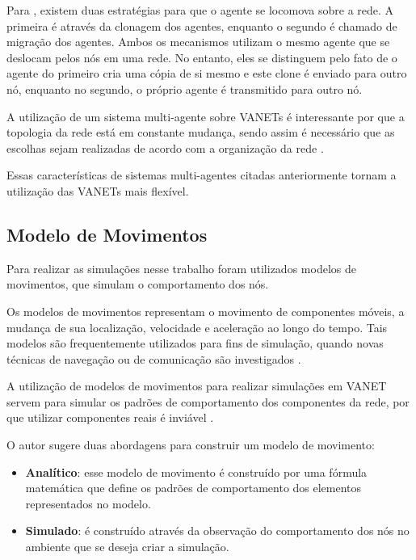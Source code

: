 Para \cite{Freitas:2011}, existem duas estratégias para que o agente se locomova sobre a rede. A primeira é através da clonagem dos agentes, enquanto o segundo é chamado de migração dos agentes. Ambos os mecanismos utilizam o mesmo agente que se deslocam pelos nós em uma rede. No entanto, eles se distinguem pelo fato de o agente do primeiro cria uma cópia de si mesmo e este clone é enviado para outro nó, enquanto no segundo, o próprio agente é transmitido para outro nó.


A utilização de um sistema multi-agente sobre VANETs é interessante por que a topologia da rede está em constante mudança, sendo assim é necessário que as escolhas sejam realizadas de acordo com a organização da rede \cite{Freitas:2011}. 

Essas características de sistemas multi-agentes citadas anteriormente tornam a utilização das VANETs mais flexível.  


\subsection{Modelo de Movimentos}

Para realizar as simulações nesse trabalho foram utilizados modelos de movimentos, que simulam o comportamento dos nós.

Os modelos de movimentos representam o movimento de componentes móveis, a mudança de sua localização, velocidade e aceleração ao longo do tempo. Tais modelos são frequentemente utilizados para fins de simulação, quando novas técnicas de navegação ou de comunicação são investigados \cite{Nichols:2007}. 

A utilização de modelos de movimentos para realizar simulações em VANET servem para simular os padrões de comportamento dos componentes da rede, por que utilizar componentes reais é inviável \cite{Freitas:2011}.

O autor \cite{Sun:2002} sugere duas abordagens para construir um modelo de movimento:

\begin{itemize}
\item \textbf{Analítico}: esse modelo de movimento é construído por uma fórmula matemática que define os padrões de comportamento dos elementos representados no modelo. 

\item \textbf{Simulado}: é construído através da observação do comportamento dos nós no ambiente que se deseja criar a simulação.

\end{itemize}

